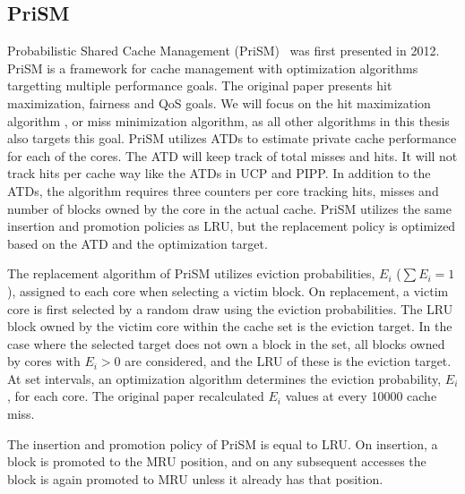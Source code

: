 \subsection{PriSM}
\label{sec:algorithms:prism}

Probabilistic Shared Cache Management (PriSM)~\cite{Manikantan2012} was first presented in 2012.
PriSM is a framework for cache management with optimization algorithms targetting multiple performance goals.
The original paper presents hit maximization, fairness and QoS goals.
We will focus on the hit maximization algorithm , or miss minimization algorithm, as all other algorithms in this thesis also targets this goal.
PriSM utilizes ATDs to estimate private cache performance for each of the cores.
The ATD will keep track of total misses and hits.
It will not track hits per cache way like the ATDs in UCP and PIPP.
In addition to the ATDs, the algorithm requires three counters per core tracking hits, misses and number of blocks owned by the core in the actual cache.
PriSM utilizes the same insertion and promotion policies as LRU, but the replacement policy is optimized based on the ATD and the optimization target.

The replacement algorithm of PriSM utilizes eviction probabilities, $E_i$ ($\sum{E_i} = 1$), assigned to each core when selecting a victim block.
On replacement, a victim core is first selected by a random draw using the eviction probabilities.
The LRU block owned by the victim core within the cache set is the eviction target.
In the case where the selected target does not own a block in the set, all blocks owned by cores with $E_i > 0$ are considered, and the LRU of these is the eviction target.
At set intervals, an optimization algorithm determines the eviction probability, $E_i$, for each core.
The original paper recalculated $E_i$ values at every 10000 cache miss.

The insertion and promotion policy of PriSM is equal to LRU.
On insertion, a block is promoted to the MRU position, and on any subsequent accesses the block is again promoted to MRU unless it already has that position.

